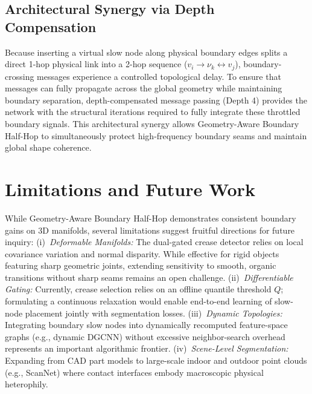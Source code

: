 \documentclass[journal]{IEEEtran}
\begin{document}
\subsection{Architectural Synergy via Depth Compensation}
Because inserting a virtual slow node along physical boundary edges splits a direct 1-hop physical link into a 2-hop sequence ($v_i \to \nu_k \leftrightarrow v_j$), boundary-crossing messages experience a controlled topological delay. To ensure that messages can fully propagate across the global geometry while maintaining boundary separation, depth-compensated message passing (Depth 4) provides the network with the structural iterations required to fully integrate these throttled boundary signals. This architectural synergy allows Geometry-Aware Boundary Half-Hop to simultaneously protect high-frequency boundary seams and maintain global shape coherence.

\newpage
\section{Limitations and Future Work}
While Geometry-Aware Boundary Half-Hop demonstrates consistent boundary gains on 3D manifolds, several limitations suggest fruitful directions for future inquiry:
(i)~\textit{Deformable Manifolds:} The dual-gated crease detector relies on local covariance variation and normal disparity. While effective for rigid objects featuring sharp geometric joints, extending sensitivity to smooth, organic transitions without sharp seams remains an open challenge.
(ii)~\textit{Differentiable Gating:} Currently, crease selection relies on an offline quantile threshold $Q$; formulating a continuous relaxation would enable end-to-end learning of slow-node placement jointly with segmentation losses.
(iii)~\textit{Dynamic Topologies:} Integrating boundary slow nodes into dynamically recomputed feature-space graphs (e.g., dynamic DGCNN) without excessive neighbor-search overhead represents an important algorithmic frontier.
(iv)~\textit{Scene-Level Segmentation:} Expanding from CAD part models to large-scale indoor and outdoor point clouds (e.g., ScanNet) where contact interfaces embody macroscopic physical heterophily.
\end{document}
